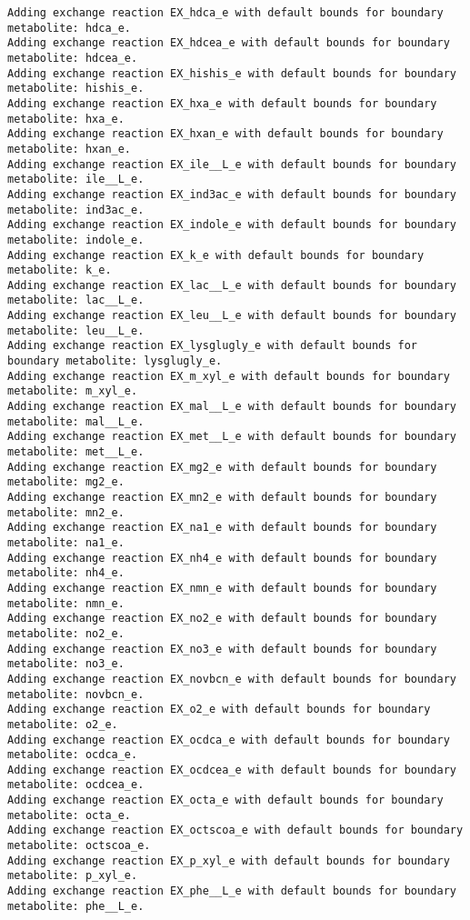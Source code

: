 \documentclass[
  letterpaper,
  DIV=11,
  numbers=noendperiod]{scrartcl}
\begin{document}
\begin{verbatim}
Adding exchange reaction EX_hdca_e with default bounds for boundary metabolite: hdca_e.
Adding exchange reaction EX_hdcea_e with default bounds for boundary metabolite: hdcea_e.
Adding exchange reaction EX_hishis_e with default bounds for boundary metabolite: hishis_e.
Adding exchange reaction EX_hxa_e with default bounds for boundary metabolite: hxa_e.
Adding exchange reaction EX_hxan_e with default bounds for boundary metabolite: hxan_e.
Adding exchange reaction EX_ile__L_e with default bounds for boundary metabolite: ile__L_e.
Adding exchange reaction EX_ind3ac_e with default bounds for boundary metabolite: ind3ac_e.
Adding exchange reaction EX_indole_e with default bounds for boundary metabolite: indole_e.
Adding exchange reaction EX_k_e with default bounds for boundary metabolite: k_e.
Adding exchange reaction EX_lac__L_e with default bounds for boundary metabolite: lac__L_e.
Adding exchange reaction EX_leu__L_e with default bounds for boundary metabolite: leu__L_e.
Adding exchange reaction EX_lysglugly_e with default bounds for boundary metabolite: lysglugly_e.
Adding exchange reaction EX_m_xyl_e with default bounds for boundary metabolite: m_xyl_e.
Adding exchange reaction EX_mal__L_e with default bounds for boundary metabolite: mal__L_e.
Adding exchange reaction EX_met__L_e with default bounds for boundary metabolite: met__L_e.
Adding exchange reaction EX_mg2_e with default bounds for boundary metabolite: mg2_e.
Adding exchange reaction EX_mn2_e with default bounds for boundary metabolite: mn2_e.
Adding exchange reaction EX_na1_e with default bounds for boundary metabolite: na1_e.
Adding exchange reaction EX_nh4_e with default bounds for boundary metabolite: nh4_e.
Adding exchange reaction EX_nmn_e with default bounds for boundary metabolite: nmn_e.
Adding exchange reaction EX_no2_e with default bounds for boundary metabolite: no2_e.
Adding exchange reaction EX_no3_e with default bounds for boundary metabolite: no3_e.
Adding exchange reaction EX_novbcn_e with default bounds for boundary metabolite: novbcn_e.
Adding exchange reaction EX_o2_e with default bounds for boundary metabolite: o2_e.
Adding exchange reaction EX_ocdca_e with default bounds for boundary metabolite: ocdca_e.
Adding exchange reaction EX_ocdcea_e with default bounds for boundary metabolite: ocdcea_e.
Adding exchange reaction EX_octa_e with default bounds for boundary metabolite: octa_e.
Adding exchange reaction EX_octscoa_e with default bounds for boundary metabolite: octscoa_e.
Adding exchange reaction EX_p_xyl_e with default bounds for boundary metabolite: p_xyl_e.
Adding exchange reaction EX_phe__L_e with default bounds for boundary metabolite: phe__L_e.

\end{verbatim}
\end{document}
